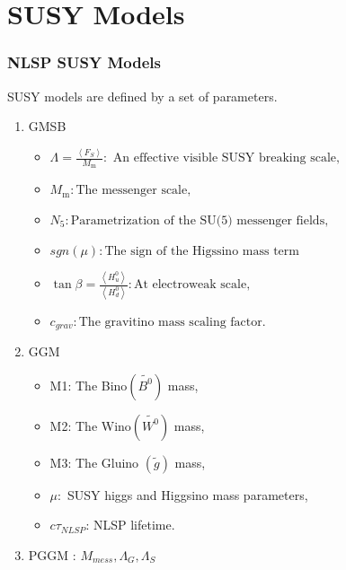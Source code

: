 \documentclass[12pt]{beamer}
\begin{document}
\section{SUSY Models}
\begin{frame}
\frametitle{NLSP SUSY Models}
SUSY models are defined by a set of parameters.
\begin{enumerate}
\item GMSB
\begin{itemize}
 \item $\displaystyle{\Lambda = \frac{\left\langle F_{S}\right\rangle}{M_{\mbox{m}}}:\mbox{ An effective visible SUSY breaking scale,}}$
 \item $\displaystyle{M_{\mbox{m}}}:\mbox{The messenger scale,}$
 \item $\displaystyle{N_{5}}:\mbox{Parametrization of the SU(5) messenger fields,}$
 \item $\displaystyle{sgn(\mu)}:\mbox{The sign of the Higssino mass term}$
 \item$\displaystyle{\tan\beta = \frac{\left\langle H^{0}_{u}\right\rangle}{\left\langle H^{0}_{d}\right\rangle}}:\mbox{At electroweak scale,}$
 \item$\displaystyle{c_{grav}}:\mbox{The gravitino mass scaling factor.}$
\end{itemize}
\item GGM
\begin{itemize}
\item M1: The Bino$(\tilde{B^{0}})$ mass,
\item M2: The Wino$(\tilde{W^{0}})$ mass,
\item M3: The Gluino $(\tilde{g})$ mass,
\item $\mu:$ SUSY higgs and Higgsino mass parameters,
\item $c\tau_{NLSP}$: NLSP lifetime.
\end{itemize}
\item PGGM : $M_{mess}, \Lambda_{G},\Lambda_{S}$
\end{enumerate}
\end{frame}
\end{document}
